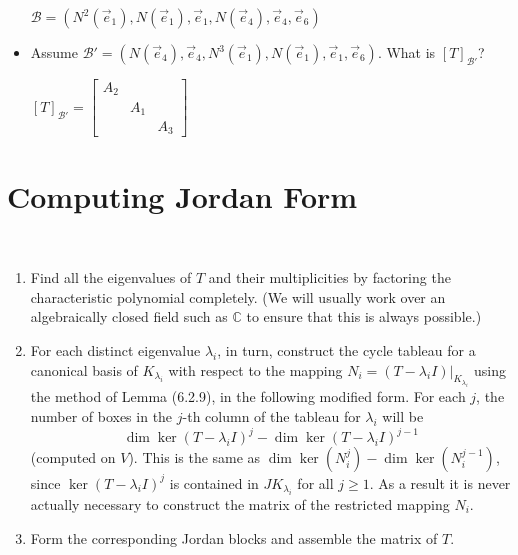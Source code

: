 \documentclass[11pt,fleqn]{book} %
\begin{document}
\begin{example}
\begin{itemize}
        $\mathcal{B} = (N^2(\vec{e}_1), N(\vec{e}_1), \vec{e}_1, N(\vec{e}_4), \vec{e}_4, \vec{e}_6)$
        
        \item Assume $\mathcal{B}' = (N(\vec{e}_4), \vec{e}_4, N^3(\vec{e}_1), N(\vec{e}_1), \vec{e}_1, \vec{e}_6)$. What is $[T]_{\mathcal{B}'}$? 
        
        $[T]_{\mathcal{B}'} = \begin{bmatrix} A_2 \\ &A_1 \\ & &A_3 \end{bmatrix}$
    \end{itemize}
\end{example}

\section{Computing Jordan Form}

\setcounter{chapter}{6}
\begin{definition}
$\text{ }$

    \begin{enumerate}[label=\alph*)]
        \item Find all the eigenvalues of $T$ and their multiplicities by factoring the characteristic polynomial completely. (We will usually work over an algebraically closed field such as $\mathbb{C}$ to ensure that this is always possible.)
        \item For each distinct eigenvalue $\lambda_i$, in turn, construct the cycle tableau for a canonical basis of $K_{\lambda_i}$ with respect to the mapping $N_i = (T - \lambda_iI)\big|_{K_{\lambda_i}}$ using the method of Lemma (6.2.9), in the following modified form. For each $j$, the number of boxes in the $j$-th column of the tableau for $\lambda_i$ will be $$\dim\ker(T - \lambda_iI)^j - \dim \ker(T - \lambda_iI)^{j-1}$$ (computed on $V$). This is the same as $\dim \ker(N_i^j) - \dim \ker (N_i^{j-1})$, since $\ker(T - \lambda_iI)^j$ is contained in $JK_{\lambda_i}$ for all $j \ge 1$. As a result it is never actually necessary to construct the matrix of the restricted mapping $N_i$. 
        \item Form the corresponding Jordan blocks and assemble the matrix of $T$. 
    \end{enumerate}
\end{definition}
\setcounter{chapter}{4}
\end{document}

